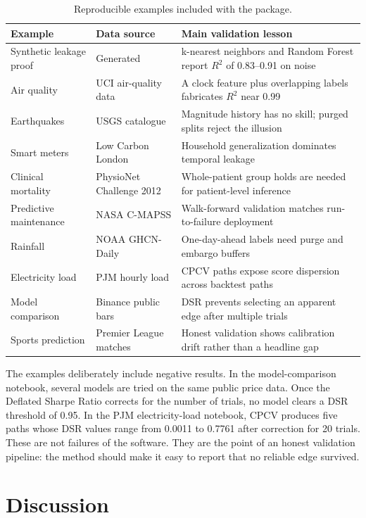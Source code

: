\documentclass[11pt]{article}
\begin{document}
\begin{table}[htbp]
\centering
\caption{Reproducible examples included with the package.}
\label{tab:examples}
\small
\begin{tabular}{p{}p{}p{}}
\toprule
Example & Data source & Main validation lesson \\
\midrule
Synthetic leakage proof & Generated & k-nearest neighbors and Random Forest report $R^2$ of 0.83--0.91 on noise \\
Air quality & UCI air-quality data & A clock feature plus overlapping labels fabricates $R^2$ near 0.99 \\
Earthquakes & USGS catalogue & Magnitude history has no skill; purged splits reject the illusion \\
Smart meters & Low Carbon London & Household generalization dominates temporal leakage \\
Clinical mortality & PhysioNet Challenge 2012 & Whole-patient group holds are needed for patient-level inference \\
Predictive maintenance & NASA C-MAPSS & Walk-forward validation matches run-to-failure deployment \\
Rainfall & NOAA GHCN-Daily & One-day-ahead labels need purge and embargo buffers \\
Electricity load & PJM hourly load & CPCV paths expose score dispersion across backtest paths \\
Model comparison & Binance public bars & DSR prevents selecting an apparent edge after multiple trials \\
Sports prediction & Premier League matches & Honest validation shows calibration drift rather than a headline gap \\
\bottomrule
\end{tabular}
\end{table}

The examples deliberately include negative results. In the model-comparison
notebook, several models are tried on the same public price data. Once the
Deflated Sharpe Ratio corrects for the number of trials, no model clears a DSR
threshold of 0.95. In the PJM electricity-load notebook, CPCV produces five
paths whose DSR values range from 0.0011 to 0.7761 after correction for 20
trials. These are not failures of the software. They are the point of an honest
validation pipeline: the method should make it easy to report that no reliable
edge survived.

\section{Discussion}
\end{document}
